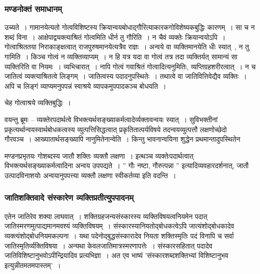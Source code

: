 			\subsubsection{मण्डनोक्तं समाधानम्} 

				\begin{small}

					उच्यते~। गामानयेत्यतो गोत्वविशिष्टस्य क्रियान्वयबोधाद्गौरित्याकारकगोविशेष्यकबुद्धिः कारणम्~। सा च न शब्दं विना~। आक्षेपाद्व्यक्त्याश्रितं गोत्वमिति धीर्न तु गौरिति~। न चैवं व्यक्तेः क्रियान्वयोऽपि~। गोत्वाश्रिततया निराकाङ्क्षत्वात् राजपुरुषमानयेत्यत्रैव राज्ञः~। अन्वये वा व्यक्तिमानयेति धीः स्यात्~, न तु गामिति~। किञ्च गोत्वं न व्यक्तिव्याप्यम्~। न हि यत्र यदा वा गोत्वं तत्र तदा व्यक्तिर्यत् सामान्यं सा व्यक्तिरिति वा नियमः~। व्यभिचारात्~। नापि गोत्वं गवाश्रितं गोत्वादित्यनुमितिः, व्यप्तिग्रहशरीरत्वात्~। न च जातित्वं व्यक्त्याश्रितत्वे लिङ्गम्~। जातित्वस्य पदादनुपस्थितेः~। तथात्वे वा जातिवित्तिवेद्यैव व्यक्तिः~। अपि च लिङ्गं व्याप्यमनुपपन्नं स्वाश्रये व्यापकमुपपादकञ्च बोधयति~।

					चेह गोत्वाश्रये व्यक्तिबुद्धिः~।

					वयन्तु ब्रूमः – व्यक्तेरपदार्थत्वे विभक्त्यर्थसङ्ख्याकर्मत्वादेर्व्यक्तावन्वयः स्यात्~। सुविभक्तीनां प्रकृत्यर्थान्वयस्वार्थबोधकत्वस्य व्युत्पत्तिसिद्धत्वात् प्रकृतितात्पर्यविषये तदन्वयव्युत्पत्तौ लक्षणोच्छेदो गौरवञ्च~। आख्यातार्थसङ्ख्यापि नानुमितेनान्वेति~। किन्तु भावनान्वयिना शुद्धेन प्रथमान्तादुपस्थितेन
				\end{small}

				मण्डनप्रभृतयः गोशब्दस्य जातौ शक्तिः व्यक्तौ लक्षणा~। इत्थञ्च व्यक्तेःपदार्थत्वात् विभक्त्यर्थसङ्ख्याकर्मत्वादिना अन्वय उपपद्यते~। ” गौः नष्टा, गौरुत्पन्ना ” इत्यादिव्यवहारदर्शनात्, जातौ उत्पादविनाशयोः अन्वयानुपपत्त्या व्यक्तौ लक्षणा स्वीकर्तव्या इति वदन्ति~। 

			\subsubsection{जातिशक्तिवादे संस्कारेण व्यक्तिप्रतीत्युपपादनम्}

				\begin{small}

					एतेन जातिरेव शक्या लाघवात्~। शक्तिग्रहजन्यसंस्कारस्य व्यक्तिविषयत्वनियमेन पदात् जातिस्मरणमुत्पाद्यमानमवश्यं व्यक्तिविषयम्~। संस्कारस्यानियतोद्बोधकत्वेऽपि जात्यंशोद्बोधकादेव व्यक्त्यंशोद्बोधनियमकल्पना~। यथा पदेनोद्बुद्धसंस्कारादेव नियता शक्तिस्मृतिः पदं विनापि च सर्वा जातिस्मृतिर्व्यक्तिविषया~। अन्यथा केवलजातिमात्रस्मरणापत्तेः~। संस्कारसहितात् पदादेव जातिविशिष्टानुभवोऽपीन्द्रियादिव प्रत्यभिज्ञा~। अत एव भाष्यं ’संस्कारशब्दशक्तिभ्यां विशिष्टानुभव इत्युन्नीतमतमपास्तम्’~। 
				\end{small}

